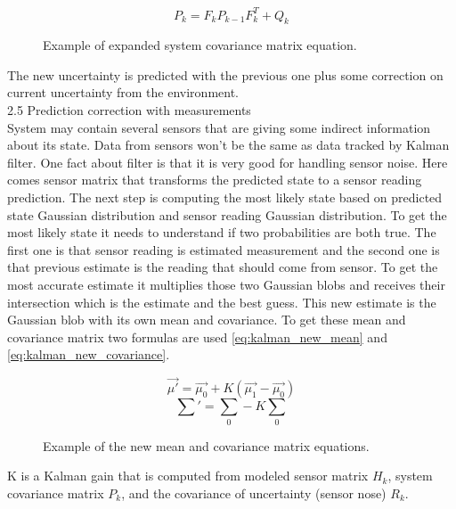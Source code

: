 \documentclass[../../main]{subfiles}
\begin{document}
\begin{figure} [!ht]
  \centering    
    \begin{equation}
       P_k = F_k P_{k-1}  F_k^T + Q_k
    \end{equation}
  \caption{Example of expanded system covariance matrix equation.}
\end{figure}

The new uncertainty is predicted with the previous one plus some correction on current uncertainty from the environment. \\

2.5 Prediction correction with measurements \\

System may contain several sensors that are giving some indirect information about its state. Data from sensors won’t be the same as data tracked by Kalman filter. One fact about filter is that it is very good for handling sensor noise.
Here comes sensor matrix that transforms the predicted state to a sensor reading prediction. The next step is computing the most likely state based on predicted state Gaussian distribution and sensor reading Gaussian distribution. To get the most likely state it needs to understand if two probabilities are both true. The first one is that sensor reading is estimated measurement and the second one is that previous estimate is the reading that should come from sensor. To get the most accurate estimate it multiplies those two Gaussian blobs and receives their intersection which is the estimate and the best guess. This new estimate is the Gaussian blob with its own mean and covariance. To get these mean and covariance matrix two formulas are used \ref{eq:kalman_new_mean} and \ref{eq:kalman_new_covariance}.

\begin{figure} [!ht]
  \centering    
    \begin{equation}
       \label{eq:kalman_new_mean}
       \vec{\mu'} = \vec{\mu_0} + K(\vec{\mu_1} - \vec{\mu_0})
    \end{equation}
     \begin{equation}
       \label{eq:kalman_new_covariance}
       \textstyle
       \sum' = \sum_0 - K \sum_0
    \end{equation}
  \caption{Example of the new mean and covariance matrix equations.}
\end{figure}

K is a Kalman gain that is computed from modeled sensor matrix $H_k$, system covariance matrix $P_k$, and the covariance of uncertainty (sensor nose) $R_k$.
\end{document}
